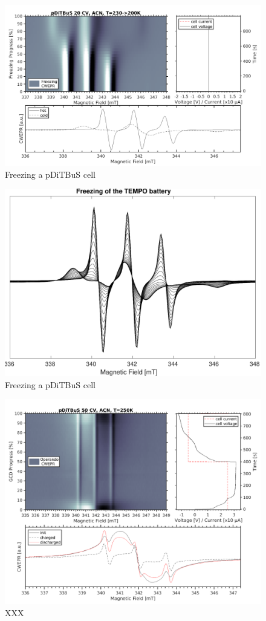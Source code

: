 \begin{figure}[h]
\center
	\includegraphics[width=1\textwidth]{./operando_epr/figures/CRYO/SANDWICH_FREEZING.pdf}
	\caption{Freezing a pDiTBuS cell}
	\label{fig:operando_cold_battery}
\end{figure}


\begin{figure}[h]
\center
	\includegraphics[width=1\textwidth]{./operando_epr/figures/CRYO/freezing_sandwich_230K_200K.pdf}
	\caption{Freezing a pDiTBuS cell}
	\label{fig:freezing_of_pditbus_battery_1D}
\end{figure}


\begin{figure}[h]
\center
	\includegraphics[width=1\textwidth]{./operando_epr/figures/slowcharge_231117_liquid_250K.pdf}
	\caption{XXX}
	\label{fig:operando_cold_cycle}
\end{figure}

